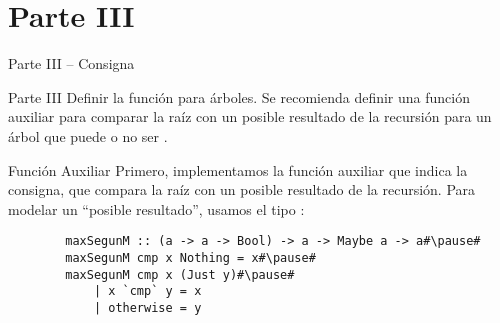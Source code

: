 \section{Parte III}

\begin{frame}{Parte III -- Consigna}
    \begin{exampleblock}{Parte III}
        Definir la función  para árboles. Se recomienda definir una función auxiliar para comparar la raíz con un posible resultado de la recursión para un árbol que puede o no ser .
    \end{exampleblock}
\end{frame}

\begin{frame}[fragile]{Función Auxiliar}
    Primero, implementamos la función auxiliar que indica la consigna, que compara la raíz con un posible resultado de la recursión. Para modelar un ``posible resultado'', usamos el tipo :

    \pause

    \begin{verbatim}
        maxSegunM :: (a -> a -> Bool) -> a -> Maybe a -> a#\pause#
        maxSegunM cmp x Nothing = x#\pause#
        maxSegunM cmp x (Just y)#\pause#
            | x `cmp` y = x
            | otherwise = y
    \end{verbatim}
\end{frame}

